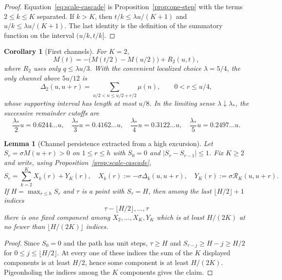 \documentclass[11pt]{amsart}
\numberwithin{equation}{section}
\theoremstyle{plain}
\newtheorem{lemma}[theorem]{Lemma}
\newtheorem{corollary}[theorem]{Corollary}
\theoremstyle{definition}
\theoremstyle{remark}
\begin{document}
\begin{proof}
Equation~\eqref{eq:scale-cascade} is Proposition~\ref{prop:one-step} with
the terms $2\le k\le K$ separated.  If $k>K$, then
$t/k\le\lambda u/(K+1)$ and $u/k\le\lambda u/(K+1)$.  The last identity is
the definition of the summatory function on the interval $(u/k,t/k]$.
\end{proof}

\begin{corollary}[First channels]
\label{cor:first-channels}
For $K=2$,
\[
M(t)=-\bigl(M(t/2)-M(u/2)\bigr)+R_2(u,t),
\]
where $R_2$ uses only $q\le\lambda u/3$.  With the convenient localized
choice $\lambda=5/4$, the only channel above $5u/12$ is
\[
\Delta_2(u,u+r)=\sum_{u/2<n\le u/2+r/2}\mu(n),
\qquad 0<r\le u/4,
\]
whose supporting interval has length at most $u/8$.  In the limiting
sense $\lambda\downarrow\lambda_*$, the successive remainder cutoffs are
\[
\frac{\lambda_*}{2}u=0.6244\ldots u,\quad
\frac{\lambda_*}{3}u=0.4162\ldots u,\quad
\frac{\lambda_*}{4}u=0.3122\ldots u,\quad
\frac{\lambda_*}{5}u=0.2497\ldots u.
\]
\end{corollary}

\begin{lemma}[Channel persistence extracted from a high excursion]
\label{lem:channel-persistence}
Let $S_r=\sigma M(u+r)>0$ on $1\le r\le h$ with $S_0=0$ and
$|S_r-S_{r-1}|\le1$.  Fix $K\ge2$ and write, using
Proposition~\ref{prop:scale-cascade},
\[
S_r=\sum_{k=2}^{K}X_k(r)+Y_K(r),
\quad
X_k(r):=-\sigma\Delta_k(u,u+r),
\quad
Y_K(r):=\sigma \mathcal R_K(u,u+r).
\]
If $H=\max_{r\le h}S_r$ and $\tau$ is a point with $S_\tau=H$, then among
the last $\lfloor H/2\rfloor+1$ indices
\[
\tau-\lfloor H/2\rfloor,\ldots,\tau
\]
there is one fixed component among
$X_2,\ldots,X_K,Y_K$ which is at least $H/(2K)$ at no fewer than
$\lfloor H/(2K)\rfloor$ indices.
\end{lemma}

\begin{proof}
Since $S_0=0$ and the path has unit steps, $\tau\ge H$ and
$S_{\tau-j}\ge H-j\ge H/2$ for
$0\le j\le\lfloor H/2\rfloor$.  At every one of these indices the sum of
the $K$ displayed components is at least $H/2$, hence some component is at
least $H/(2K)$.  Pigeonholing the indices among the $K$ components gives the
claim.
\end{proof}
\end{document}
